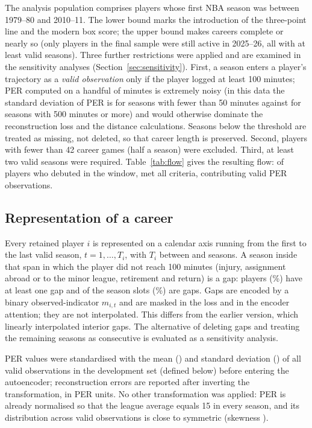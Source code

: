 The analysis population comprises players whose first NBA season was between 1979--80 and 2010--11. The lower bound marks the introduction of the three-point line and the modern box score; the upper bound makes careers complete or nearly so (only \nActive{} players in the final sample were still active in 2025--26, all with at least \minActiveSeason{} valid seasons). Three further restrictions were applied and are examined in the sensitivity analyses (Section~\ref{sec:sensitivity}). First, a season enters a player's trajectory as a \emph{valid observation} only if the player logged at least 100 minutes; PER computed on a handful of minutes is extremely noisy (in this data the standard deviation of PER is \sdPerLowMp{} for seasons with fewer than 50 minutes against \sdPerHighMp{} for seasons with 500 minutes or more) and would otherwise dominate the reconstruction loss and the distance calculations. Seasons below the threshold are treated as missing, not deleted, so that career length is preserved. Second, players with fewer than 42 career games (half a season) were excluded. Third, at least two valid seasons were required. Table~\ref{tab:flow} gives the resulting flow: of \nDebutWindow{} players who debuted in the window, \nPlayers{} met all criteria, contributing \nObs{} valid PER observations.

\subsection{Representation of a career}

Every retained player $i$ is represented on a calendar axis running from the first to the last valid season, $t=1,\dots,T_i$, with $T_i$ between \minSpan{} and \maxSpan{} seasons. A season inside that span in which the player did not reach 100 minutes (injury, assignment abroad or to the minor league, retirement and return) is a gap: \nGapPlayers{} players (\pctGapPlayers\%) have at least one gap and \nGapSeasons{} of the \nSpanSeasons{} season slots (\pctGapSeasons\%) are gaps. Gaps are encoded by a binary observed-indicator $m_{i,t}$ and are masked in the loss and in the encoder attention; they are not interpolated. This differs from the earlier version, which linearly interpolated interior gaps. The alternative of deleting gaps and treating the remaining seasons as consecutive is evaluated as a sensitivity analysis.

PER values were standardised with the mean (\muPer) and standard deviation (\sdPer) of all valid observations in the development set (defined below) before entering the autoencoder; reconstruction errors are reported after inverting the transformation, in PER units. No other transformation was applied: PER is already normalised so that the league average equals 15 in every season, and its distribution across valid observations is close to symmetric (skewness \skewPer).


